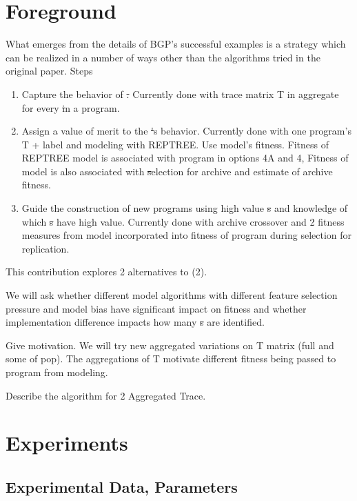 \section{Foreground}\label{sect:foreground}
What emerges from the details of BGP's successful examples is a strategy which can be realized in a number of ways other than the algorithms tried in the original paper.
Steps
\begin{enumerate}
\item Capture the behavior of \st. Currently done with trace matrix T in aggregate for every \st in a program.
\item Assign a value of merit to the \st's behavior. Currently done with one program's T + label and modeling with REPTREE. Use model's fitness. Fitness of REPTREE model is associated with program in options 4A and 4, Fitness of model is also associated with \st selection for archive and estimate of archive fitness.
\item Guide the construction of new programs using high value \st{s} and knowledge of which \st{s} have high value. Currently done with archive crossover and 2 fitness measures from model incorporated into fitness of program during selection for replication.
\end{enumerate}

This contribution explores 2 alternatives to (2). \begin{inparaenum}\item We will ask whether different model algorithms  with different feature selection pressure and model bias have significant impact on fitness and whether implementation difference impacts how many  \st{s} are identified.  \item Give motivation. We will try new aggregated variations on T matrix  (full and some of pop). The aggregations of T motivate different fitness being passed to program from modeling.\end{inparaenum}
Describe the algorithm for 2 Aggregated Trace.


\section{Experiments}\label{sect:experiments}

\subsection{Experimental Data, Parameters}\label{sect:data_sets}

